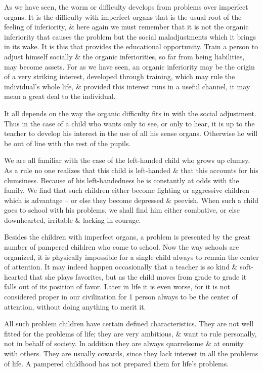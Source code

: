 \documentclass{article}
\begin{document}
As we have seen, the worm or difficulty develops from problems over imperfect organs. It is the difficulty with imperfect organs that is the usual root of the feeling of inferiority, \& here again we must remember that it is not the organic inferiority that causes the problem but the social maladjustments which it brings in its wake. It is this that provides the educational opportunity. Train a person to adjust himself socially \& the organic inferiorities, so far from being liabilities, may become assets. For as we have seen, an organic inferiority may be the origin of a very striking interest, developed through training, which may rule the individual's whole life, \& provided this interest runs in a useful channel, it may mean a great deal to the individual.

It all depends on the way the organic difficulty fits in with the social adjustment. Thus in the case of a child who wants only to see, or only to hear, it is up to the teacher to develop his interest in the use of all his sense organs. Otherwise he will be out of line with the rest of the pupils.

We are all familiar with the case of the left-handed child who grows up clumsy. As a rule no one realizes that this child is left-handed \& that this accounts for his clumsiness. Because of his left-handedness he is constantly at odds with the family. We find that such children either become fighting or aggressive children -- which is advantage -- or else they become depressed \& peevish. When such a child goes to school with his problems, we shall find him either combative, or else downhearted, irritable \& lacking in courage.

Besides the children with imperfect organs, a problem is presented by the great number of pampered children who come to school. Now the way schools are organized, it is physically impossible for a single child always to remain the center of attention. It may indeed happen occasionally that a teacher is so kind \& soft-hearted that she plays favorites, but as the child moves from grade to grade it falls out of its position of favor. Later in life it is even worse, for it is not considered proper in our civilization for 1 person always to be the center of attention, without doing anything to merit it.

All such problem children have certain defined characteristics. They are not well fitted for the problems of life; they are very ambitious, \& want to rule personally, not in behalf of society. In addition they are always quarrelsome \& at enmity with others. They are usually cowards, since they lack interest in all the problems of life. A pampered childhood has not prepared them for life's problems.
\end{document}
